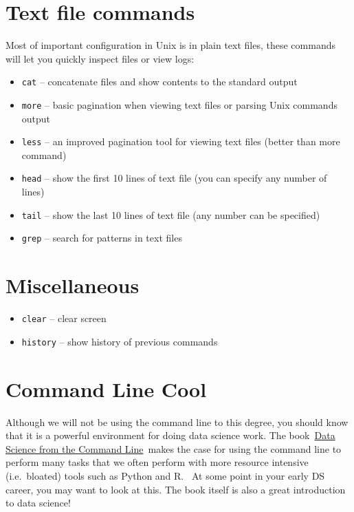 \documentclass[
  letterpaper,
  DIV=11,
  numbers=noendperiod]{scrreport}
\providecommand{\tightlist}{%
  \setlength{\itemsep}{0pt}\setlength{\parskip}{0pt}}\usepackage{longtable,booktabs,array}
\begin{document}
\hypertarget{text-file-commands}{%
\section{Text file commands}\label{text-file-commands}}

Most of important configuration in Unix is in plain text files, these
commands will let you quickly inspect files or view logs:

\begin{itemize}
\tightlist
\item
  \texttt{cat} -- concatenate files and show contents to the standard
  output
\item
  \texttt{more} -- basic pagination when viewing text files or parsing
  Unix commands output
\item
  \texttt{less} -- an improved pagination tool for viewing text files
  (better than more command)
\item
  \texttt{head} -- show the first 10 lines of text file (you can specify
  any number of lines)
\item
  \texttt{tail} -- show the last 10 lines of text file (any number can
  be specified)
\item
  \texttt{grep} -- search for patterns in text files
\end{itemize}

\hypertarget{miscellaneous}{%
\section{Miscellaneous}\label{miscellaneous}}

\begin{itemize}
\tightlist
\item
  \texttt{clear} -- clear screen
\item
  \texttt{history} -- show history of previous commands
\end{itemize}

\hypertarget{command-line-cool}{%
\section{Command Line Cool}\label{command-line-cool}}

Although we will not be using the command line to this degree, you
should know that it is a powerful environment for doing data science
work. The book~\href{https://datascienceatthecommandline.com/2e/}{Data
Science from the Command Line}~makes the case for using the command line
to perform many tasks that we often perform with more resource intensive
(i.e.~bloated) tools such as Python and R.~ At some point in your early
DS career, you may want to look at this. The book itself is also a great
introduction to data science!
\end{document}
